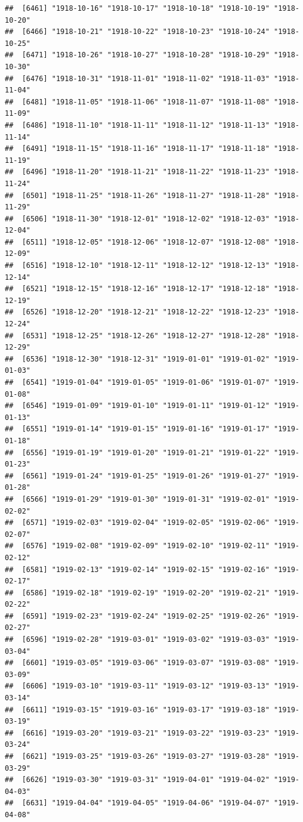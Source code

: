 \documentclass{article}\usepackage[]{graphicx}\usepackage[]{color}
\makeatletter
\newenvironment{kframe}{%
 \def\at@end@of@kframe{}%
 \ifinner\ifhmode%
  \def\at@end@of@kframe{\end{minipage}}%
  \begin{minipage}{\columnwidth}%
 \fi\fi%
 \def\FrameCommand##1{\hskip\@totalleftmargin \hskip-\fboxsep
 \colorbox{shadecolor}{##1}\hskip-\fboxsep
     \hskip-\linewidth \hskip-\@totalleftmargin \hskip\columnwidth}%
 \MakeFramed {\advance\hsize-\width
   \@totalleftmargin\z@ \linewidth\hsize
   \@setminipage}}%
 {\par\unskip\endMakeFramed%
 \at@end@of@kframe}
\newenvironment{knitrout}{}{} %
\makeatother
\begin{document}
\begin{description}
\begin{knitrout}
\begin{kframe}
\begin{verbatim}
##  [6461] "1918-10-16" "1918-10-17" "1918-10-18" "1918-10-19" "1918-10-20"
##  [6466] "1918-10-21" "1918-10-22" "1918-10-23" "1918-10-24" "1918-10-25"
##  [6471] "1918-10-26" "1918-10-27" "1918-10-28" "1918-10-29" "1918-10-30"
##  [6476] "1918-10-31" "1918-11-01" "1918-11-02" "1918-11-03" "1918-11-04"
##  [6481] "1918-11-05" "1918-11-06" "1918-11-07" "1918-11-08" "1918-11-09"
##  [6486] "1918-11-10" "1918-11-11" "1918-11-12" "1918-11-13" "1918-11-14"
##  [6491] "1918-11-15" "1918-11-16" "1918-11-17" "1918-11-18" "1918-11-19"
##  [6496] "1918-11-20" "1918-11-21" "1918-11-22" "1918-11-23" "1918-11-24"
##  [6501] "1918-11-25" "1918-11-26" "1918-11-27" "1918-11-28" "1918-11-29"
##  [6506] "1918-11-30" "1918-12-01" "1918-12-02" "1918-12-03" "1918-12-04"
##  [6511] "1918-12-05" "1918-12-06" "1918-12-07" "1918-12-08" "1918-12-09"
##  [6516] "1918-12-10" "1918-12-11" "1918-12-12" "1918-12-13" "1918-12-14"
##  [6521] "1918-12-15" "1918-12-16" "1918-12-17" "1918-12-18" "1918-12-19"
##  [6526] "1918-12-20" "1918-12-21" "1918-12-22" "1918-12-23" "1918-12-24"
##  [6531] "1918-12-25" "1918-12-26" "1918-12-27" "1918-12-28" "1918-12-29"
##  [6536] "1918-12-30" "1918-12-31" "1919-01-01" "1919-01-02" "1919-01-03"
##  [6541] "1919-01-04" "1919-01-05" "1919-01-06" "1919-01-07" "1919-01-08"
##  [6546] "1919-01-09" "1919-01-10" "1919-01-11" "1919-01-12" "1919-01-13"
##  [6551] "1919-01-14" "1919-01-15" "1919-01-16" "1919-01-17" "1919-01-18"
##  [6556] "1919-01-19" "1919-01-20" "1919-01-21" "1919-01-22" "1919-01-23"
##  [6561] "1919-01-24" "1919-01-25" "1919-01-26" "1919-01-27" "1919-01-28"
##  [6566] "1919-01-29" "1919-01-30" "1919-01-31" "1919-02-01" "1919-02-02"
##  [6571] "1919-02-03" "1919-02-04" "1919-02-05" "1919-02-06" "1919-02-07"
##  [6576] "1919-02-08" "1919-02-09" "1919-02-10" "1919-02-11" "1919-02-12"
##  [6581] "1919-02-13" "1919-02-14" "1919-02-15" "1919-02-16" "1919-02-17"
##  [6586] "1919-02-18" "1919-02-19" "1919-02-20" "1919-02-21" "1919-02-22"
##  [6591] "1919-02-23" "1919-02-24" "1919-02-25" "1919-02-26" "1919-02-27"
##  [6596] "1919-02-28" "1919-03-01" "1919-03-02" "1919-03-03" "1919-03-04"
##  [6601] "1919-03-05" "1919-03-06" "1919-03-07" "1919-03-08" "1919-03-09"
##  [6606] "1919-03-10" "1919-03-11" "1919-03-12" "1919-03-13" "1919-03-14"
##  [6611] "1919-03-15" "1919-03-16" "1919-03-17" "1919-03-18" "1919-03-19"
##  [6616] "1919-03-20" "1919-03-21" "1919-03-22" "1919-03-23" "1919-03-24"
##  [6621] "1919-03-25" "1919-03-26" "1919-03-27" "1919-03-28" "1919-03-29"
##  [6626] "1919-03-30" "1919-03-31" "1919-04-01" "1919-04-02" "1919-04-03"
##  [6631] "1919-04-04" "1919-04-05" "1919-04-06" "1919-04-07" "1919-04-08"

\end{verbatim}
\end{kframe}
\end{knitrout}
\end{description}
\end{document}
